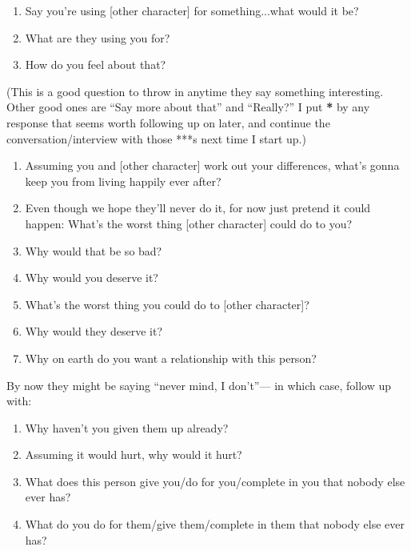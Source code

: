 \documentclass[openleft,oneside,showtrims]{memoir}
\begin{document}
\begin{enumerate}
\item Say you're using [other character] for something...what would it be?

\item What are they using you for?

\item How do you feel about that?
\end{enumerate}
(This is a good question to throw in anytime they say something interesting. Other good ones are ``Say more about that'' and ``Really?'' I put \textbf{*} by any response that seems worth following up on later, and continue the conversation/interview with those ***s next time I start up.)

\begin{enumerate}
\item Assuming you and [other character] work out your differences, what's gonna keep you from living happily ever after?

\item Even though we hope they'll never do it, for now just pretend it could happen: What's the worst thing [other character] could do to you?

\item Why would that be so bad?

\item Why would you deserve it?

\item What's the worst thing you could do to [other character]?

\item Why would they deserve it?

\item Why on earth do you want a relationship with this person?
\end{enumerate}

By now they might be saying ``never mind, I don't''— in which case, follow up with:

\begin{enumerate}
\item Why haven't you given them up already?

\item Assuming it would hurt, why would it hurt?

\item What does this person give you/do for you/complete in you that nobody else ever has?

\item What do you do for them/give them/complete in them that nobody else ever has?
\end{enumerate}
\end{document}
